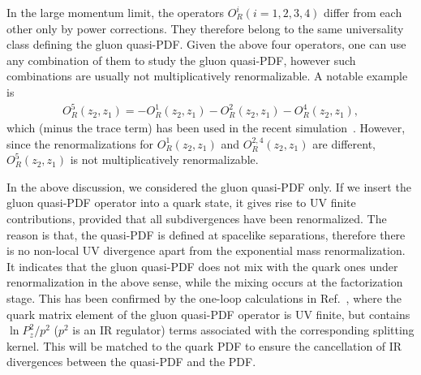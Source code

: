 In the large momentum limit,
the operators $O^{i}_R(i=1,2,3,4)$ differ from each other only by power corrections. They therefore belong to the same universality class defining the gluon quasi-PDF.
Given the above four operators, one can use any combination of them to study the gluon quasi-PDF, however such combinations are usually not multiplicatively renormalizable. A notable example is
\begin{align}
{  O}^{5}_R(z_2,z_1)
 =    -  {  O}^{1}_R(z_2,z_1)-  {  O}^2_R(z_2, z_1)-{  O}^4_R(z_2, z_1),
\end{align}
which (minus the trace term) has been used in the recent simulation~\cite{Fan:2018dxu}.
However, since the renormalizations for ${  O}^{1}_R(z_2,z_1)$ and  ${  O}_R^{2,4}(z_2, z_1)$ are different, ${  O}_R^{5}(z_2,z_1)$ is not multiplicatively renormalizable.

In the above discussion, we considered the gluon quasi-PDF only. If we insert the gluon quasi-PDF operator into a quark state, it gives rise to UV finite contributions, provided that all subdivergences have been renormalized. The reason is that, the quasi-PDF is defined at spacelike separations, therefore there is no non-local UV divergence apart from the exponential mass renormalization. It indicates that the gluon quasi-PDF does not mix with the quark ones under renormalization in the above sense, while the mixing occurs at the factorization stage. This has been confirmed by the one-loop calculations in Ref.~\cite{Wang:2017qyg}, where the quark matrix element of the gluon quasi-PDF operator is UV finite, but contains $\ln P_z^2/p^2$ ($p^2$ is an IR regulator) terms associated with the corresponding splitting kernel. This will be matched to the quark PDF to ensure the cancellation of IR divergences between the quasi-PDF and the PDF.
